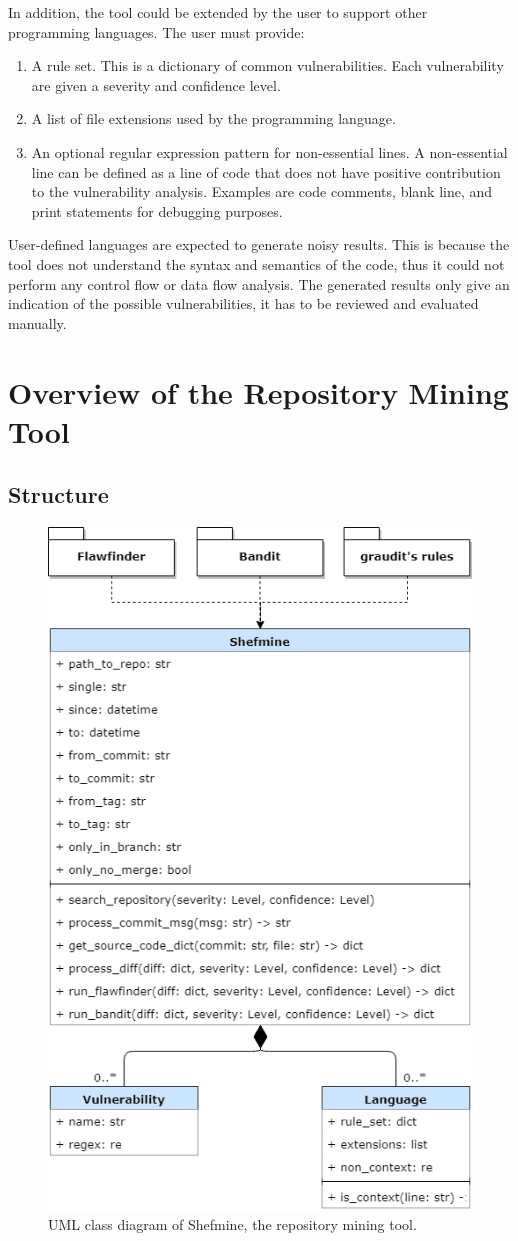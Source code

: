 \documentclass[12pt, a4paper]{report}
\begin{document}
In addition, the tool could be extended by the user to support other programming languages. The user
must provide:
\begin{enumerate}
  \item A rule set. This is a dictionary of common vulnerabilities. Each vulnerability are
  given a severity and confidence level.
  \item A list of file extensions used by the programming language.
  \item An optional regular expression pattern for non-essential lines. A non-essential line
  can be defined as a line of code that does not have positive contribution to the vulnerability
  analysis. Examples are code comments, blank line, and print statements for debugging purposes.
\end{enumerate}

User-defined languages are expected to generate noisy results. This is because the tool does not
understand the syntax and semantics of the code, thus it could not perform any control flow or data
flow analysis. The generated results only give an indication of the possible vulnerabilities, it has
to be reviewed and evaluated manually.

\section{Overview of the Repository Mining Tool}
\subsection{Structure}
\begin{figure}[H]
  \centering
  \includegraphics[width=.65\textwidth]{images/class_diagram.png}
  \caption{UML class diagram of Shefmine, the repository mining tool.}
  \label{figure:class_diagram}
\end{figure}
\end{document}
